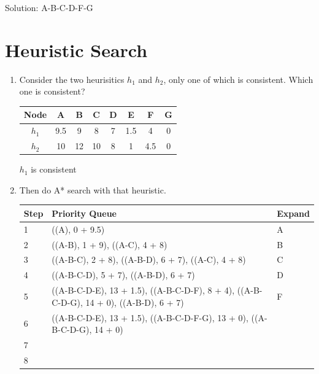 \documentclass[11pt]{article}
\begin{document}
\begin{enumerate}
    Solution: A-B-C-D-F-G

\end{enumerate}

\clearpage

\section{Heuristic Search}

   \begin{enumerate}
  
   \item Consider the two heurisitics $h_1$ and $h_2$, only one of
     which is consistent.  Which one is consistent?

\begin{center}
\begin{tabular}{|c|c|c|c|c|c|c|c|}\hline
Node  & A   & B  & C  & D  & E   & F   & G  \\ \hline
$h_1$ & 9.5 & 9	 & 8  & 7  & 1.5 & 4   & 0  \\ \hline
$h_2$ & 10  & 12 & 10 & 8  & 1   & 4.5 & 0  \\ \hline
\end{tabular}
\end{center}

$h_1$ is consistent

  \item Then do A* search with that heuristic.

    \begin{center}
    \begin{tabular}{|l|l@{\hspace*{0.1in}}|l|} \hline
    \bf Step & \bf Priority Queue                                   & \bf Expand \\ \hline
    1 & ((A), 0 + 9.5)                                       & A \\ \hline
    2 & ((A-B), 1 + 9), ((A-C), 4 + 8)                       & B \\ \hline
    3 & ((A-B-C), 2 + 8), ((A-B-D), 6 + 7), ((A-C), 4 + 8)   & C \\ \hline
    4 & ((A-B-C-D), 5 + 7), ((A-B-D), 6 + 7)  & D \\ \hline
    5 & ((A-B-C-D-E), 13 + 1.5), ((A-B-C-D-F), 8 + 4), ((A-B-C-D-G), 14 + 0), ((A-B-D), 6 + 7)  & F \\ \hline
    6 & ((A-B-C-D-E), 13 + 1.5), ((A-B-C-D-F-G), 13 + 0), ((A-B-C-D-G), 14 + 0) & \\ \hline
    7 & &  \\ \hline
    8 & &  \\ \hline
    \end{tabular}
    \end{center}


\end{enumerate}
\end{document}
